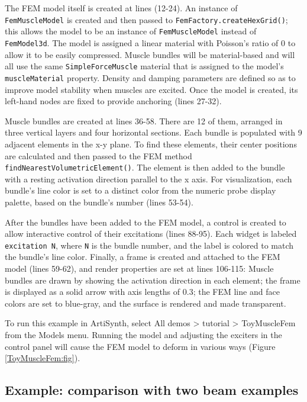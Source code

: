 The FEM model itself is created at lines (12-24). An instance of {\tt
FemMuscleModel} is created and then passed to {\tt FemFactory.createHexGrid()};
this allows the model to be an instance of {\tt FemMuscleModel} instead of {\tt
FemModel3d}.  The model is assigned a linear material with Poisson's ratio of 0
to allow it to be easily compressed. Muscle bundles will be material-based and
will all use the same {\tt SimpleForceMuscle} material that is assigned to the
model's {\tt muscleMaterial} property. Density and damping parameters are
defined so as to improve model stability when muscles are excited.  Once the
model is created, its left-hand nodes are fixed to provide anchoring (lines
27-32).

Muscle bundles are created at lines 36-58. There are 12 of them, arranged in
three vertical layers and four horizontal sections. Each bundle is populated
with 9 adjacent elements in the x-y plane. To find these elements, their center
positions are calculated and then passed to the FEM method {\tt
findNearestVolumetricElement()}. The element is then added to the bundle with a
resting activation direction parallel to the x axis. For visualization, each
bundle's line color is set to a distinct color from the numeric probe display
palette, based on the bundle's number (lines 53-54).

After the bundles have been added to the FEM model, a control is created to
allow interactive control of their excitations (lines 88-95). Each widget is
labeled {\tt excitation N}, where {\tt N} is the bundle number, and the label
is colored to match the bundle's line color.  Finally, a frame is created and
attached to the FEM model (lines 59-62), and render properties are set at lines
106-115: Muscle bundles are drawn by showing the activation direction in each
element; the frame is displayed as a solid arrow with axis lengths of 0.3; the
FEM line and face colors are set to blue-gray, and the surface is rendered and
made transparent.

To run this example in ArtiSynth, select {\sf All demos > tutorial >
ToyMuscleFem} from the {\sf Models} menu. Running the model and adjusting the
exciters in the control panel will cause the FEM model to deform in various
ways (Figure \ref{ToyMuscleFem:fig}).

\subsection{Example: comparison with two beam examples}
\label{FemMuscleBeams:sec}

